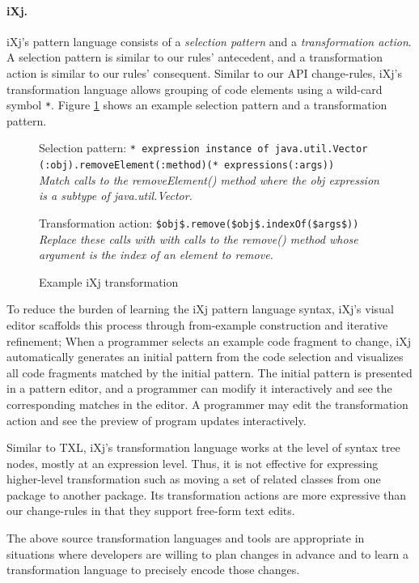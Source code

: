 \documentclass[runningheads,a4paper]{llncs}
\newcommand{\codefont}[1]{\footnotesize{\texttt{#1}}\normalsize}
\begin{document}
\paragraph{\textbf{iXj.}} 
iXj's pattern language consists of a {\em selection pattern} and a {\em transformation action}. A selection pattern is similar to our rules' antecedent, and a transformation action is similar to our rules' consequent. Similar to our API change-rules, iXj's transformation language allows grouping of code elements using a wild-card symbol \codefont{*}. Figure \ref{ixj_example} shows an example selection pattern and a transformation pattern. 

\begin{figure} 
Selection pattern: \codefont{* expression instance of java.util.Vector (:obj).removeElement(:method)(* expressions(:args))} \\
\it{Match calls to the {removeElement()} method where the {obj} expression is a subtype of {java.util.Vector}.} 

Transformation action: \codefont{\$obj\$.remove(\$obj\$.indexOf(\$args\$))} \\
\it{Replace these calls with with calls to the {remove()} method whose argument is the index of an element to remove.} 

\caption{Example iXj transformation} 
\label{ixj_example} 
\end{figure} 


To reduce the burden of learning the iXj pattern language syntax, iXj's visual editor scaffolds this process through from-example construction and iterative refinement; When a programmer selects an example code fragment to change, iXj automatically generates an initial pattern from the code selection and visualizes all code fragments matched by the initial pattern. The initial pattern is presented in a pattern editor, and a programmer can modify it interactively and see the corresponding matches in the editor. A programmer may edit the transformation action and see the preview of program updates interactively. 

Similar to TXL, iXj's transformation language works at the level of syntax tree nodes, mostly at an expression level. Thus, it is not effective for expressing higher-level transformation such as moving a set of related classes from one package to another package. Its transformation actions are more expressive than our change-rules in that they support free-form text edits.

The above source transformation languages and tools are appropriate in situations where developers are willing to plan changes in advance and to learn a transformation language to precisely encode those changes.
\end{document}
